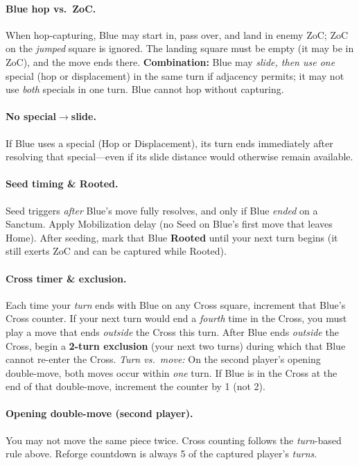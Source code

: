 \documentclass[11pt]{article}
\begin{document}
\paragraph{Blue hop vs.\ ZoC.}
When hop-capturing, Blue may start in, pass over, and land in enemy ZoC; ZoC on the \emph{jumped} square is ignored. The landing square must be empty (it may be in ZoC), and the move ends there.
\textbf{Combination:} Blue may \emph{slide, then use one} special (hop or displacement) in the same turn if adjacency permits; it may not use \emph{both} specials in one turn. Blue cannot hop without capturing.

\paragraph{No special$\rightarrow$slide.}
If Blue uses a special (Hop or Displacement), its turn ends immediately after resolving that special—even if its slide distance would otherwise remain available.

\paragraph{Seed timing \& Rooted.}
Seed triggers \emph{after} Blue’s move fully resolves, and only if Blue \emph{ended} on a Sanctum. Apply Mobilization delay (no Seed on Blue’s first move that leaves Home). After seeding, mark that Blue \textbf{Rooted} until your next turn begins (it still exerts ZoC and can be captured while Rooted).

\paragraph{Cross timer \& exclusion.}
Each time your \emph{turn} ends with Blue on any Cross square, increment that Blue’s Cross counter. If your next turn would end a \emph{fourth} time in the Cross, you must play a move that ends \emph{outside} the Cross this turn. After Blue ends \emph{outside} the Cross, begin a \textbf{2-turn exclusion} (your next two turns) during which that Blue cannot re-enter the Cross.
\emph{Turn vs.\ move:} On the second player’s opening double-move, both moves occur within \emph{one} turn. If Blue is in the Cross at the end of that double-move, increment the counter by 1 (not 2).

\paragraph{Opening double-move (second player).}
You may not move the same piece twice. Cross counting follows the \emph{turn}-based rule above. Reforge countdown is always 5 of the captured player’s \emph{turns}.
\end{document}

